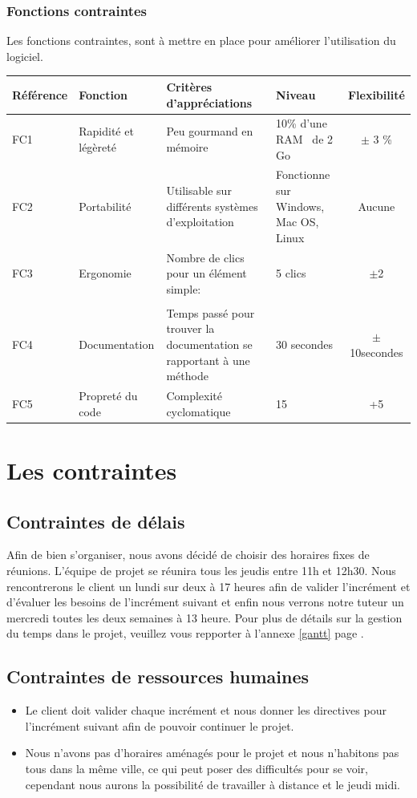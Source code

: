\documentclass[12pt,a4paper,openany]{article}
\begin{document}
	\subsubsection{Fonctions contraintes}
	Les fonctions contraintes, sont à mettre en place pour améliorer l'utilisation du logiciel.\\
	\begin{tabular}{|p{2cm}|p{3.5cm}|p{5cm}|p{3cm}|c|}
		\hline
		\textbf{Référence}& \textbf{Fonction} & \textbf{Critères d'appréciations} & \textbf{Niveau} & \textbf{Flexibilité} \\
		\hline
		FC1 & Rapidité et légèreté & Peu gourmand en mémoire & 10\% d'une RAM \footnotemark~de 2 Go & $\pm$ 3 \%\\
		\hline
			FC2 & Portabilité & Utilisable sur différents systèmes d'exploitation & Fonctionne sur Windows, Mac OS, Linux & Aucune \\
		\hline
		FC3 & Ergonomie & Nombre de clics pour un élément simple: & 5 clics &$\pm$2\\& &\begin{center}\end{center}&  & \\
		\hline
			FC4 & Documentation & Temps passé pour trouver la documentation se rapportant à une méthode &30 secondes& $\pm$10secondes \\ 
		\hline
			FC5 & Propreté du code & Complexité cyclomatique& 15 & +5\\ 
		\hline
	\end{tabular}

	\section{Les contraintes}
	\subsection{Contraintes de délais}
	Afin de bien s'organiser, nous avons décidé de choisir des horaires fixes de réunions. L'équipe de projet se réunira tous
	les jeudis entre 11h et 12h30. Nous rencontrerons le client un lundi sur deux à 17 heures afin de valider l'incrément et d'évaluer les
	besoins de l'incrément suivant et enfin nous verrons notre tuteur un mercredi toutes les deux semaines à 13 heure. 
	Pour plus de détails sur la gestion du temps dans le projet, veuillez vous repporter à l'annexe \ref{gantt} page \pageref{gantt}.
	
	\subsection{Contraintes de ressources humaines}
	\begin{itemize}
		\item Le client doit valider chaque incrément et nous donner les directives pour l'incrément suivant afin de pouvoir continuer le projet. 
		\item Nous n'avons pas d'horaires aménagés pour le projet et nous n'habitons pas tous dans la même ville, ce qui peut poser des difficultés pour se voir, cependant nous aurons la possibilité de travailler à distance et le jeudi midi.
	\end{itemize}
\end{document}
